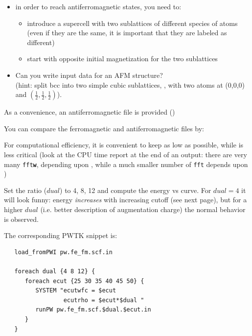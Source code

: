 \documentclass[landscape]{foils}
\begin{document}
\begin{itemize}
  \item in order to reach antiferromagnetic states, you need to:
  \begin{itemize}
  \item introduce a {\red supercell} with two sublattices of 
    different species of atoms (even if they are the same,
    it is important that they are labeled as different)
  \item start with opposite initial magnetization for the two 
    sublattices
  \end{itemize} 

\item Can you write input data for an AFM structure?\\
  (hint: split bcc into two simple cubic sublattices, ,
  with two atoms at (0,0,0) and
  $(\frac{1}{2},\frac{1}{2},\frac{1}{2})$).  
\end{itemize}

\vfill
{\gray As a convenience, an antiferromagnetic file is
  provided ()

You can compare the ferromagnetic and antiferromagnetic files
by:\\[1em]
}


%
For computational efficiency, it is convenient to keep 
as low as possible, while  is less critical
{\small (look at 
the CPU time report at the end of an output: there are very many
\texttt{fft{\bf w}}, depending upon , while a much smaller
number of \texttt{fft} depends upon )}

Set the  ratio ($dual$) to 4, 8, 12 and compute
the energy vs  curve. For $dual=4$ it will look funny:
energy {\em increases} with increasing cutoff (see next page), but for
a higher $dual$ (i.e.\@{} better description of augmentation charge) the
normal behavior is observed.

The corresponding PWTK snippet is:
{\codecolor\small
\begin{verbatim}
   load_fromPWI pw.fe_fm.scf.in

   foreach dual {4 8 12} {
      foreach ecut {25 30 35 40 45 50} {
         SYSTEM "ecutwfc = $ecut
                 ecutrho = $ecut*$dual "
         runPW pw.fe_fm.scf.$dual.$ecut.in
      }
   }
\end{verbatim}
}
\end{document}
